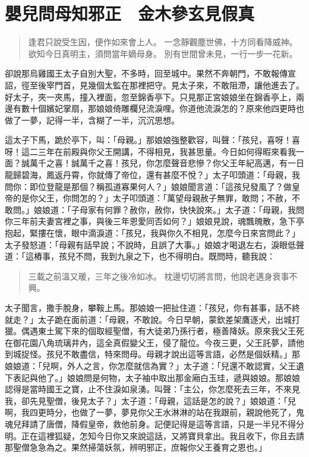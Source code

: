 
\chapter{嬰兒問母知邪正　金木參玄見假真}

\begin{quote}
逢君只說受生因，便作如來會上人。
一念靜觀塵世佛，十方同看降威神。
欲知今日真明主，須問當年嫡母身。
別有世間曾未見，一行一步一花新。
\end{quote}

卻說那烏雞國王太子自別大聖，不多時，回至城中。果然不奔朝門，不敢報傳宣詔，徑至後宰門首，見幾個太監在那裡把守。見太子來，不敢阻滯，讓他進去了。好太子，夾一夾馬，撞入裡面，忽至錦香亭下。只見那正宮娘娘坐在錦香亭上，兩邊有數十個嬪妃掌扇，那娘娘倚雕欄兒流淚哩。你道他流淚怎的？原來他四更時也做了一夢，記得一半，含糊了一半，沉沉思想。

這太子下馬，跪於亭下，叫：「母親。」那娘娘強整歡容，叫聲：「孩兒，喜呀！喜呀！這二三年在前殿與你父王開講，不得相見，我甚思量。今日如何得暇來看我一面？誠萬千之喜！誠萬千之喜！孩兒，你怎麼聲音悲慘？你父王年紀高邁，有一日龍歸碧海，鳳返丹霄，你就傳了帝位，還有甚麼不悅？」太子叩頭道：「母親，我問你：即位登龍是那個？稱孤道寡果何人？」娘娘聞言道：「這孩兒發風了？做皇帝的是你父王，你問怎的？」太子叩頭道：「萬望母親赦子無罪，敢問；不赦，不敢問。」娘娘道：「子母家有何罪？赦你，赦你，快快說來。」太子道：「母親，我問你三年前夫妻宮裡之事，與後三年恩愛同否如何？」娘娘見說，魂飄魄散，急下亭抱起，緊摟在懷，眼中滴淚道：「孩兒，我與你久不相見，怎麼今日來宮問此？」太子發怒道：「母親有話早說；不說時，且誤了大事。」娘娘才喝退左右，淚眼低聲道：「這樁事，孩兒不問，我到九泉之下，也不得明白。既問時，聽我說：
\begin{quote}
三載之前溫又暖，三年之後冷如冰。
枕邊切切將言問，他說老邁身衰事不興。
\end{quote}

太子聞言，撒手脫身，攀鞍上馬。那娘娘一把扯住道：「孩兒，你有甚事，話不終就走？」太子跪在面前道：「母親，不敢說。今日早朝，蒙欽差架鷹逐犬，出城打獵。偶遇東土駕下來的個取經聖僧，有大徒弟乃孫行者，極善降妖。原來我父王死在御花園八角琉璃井內，這全真假變父王，侵了龍位。今夜三更，父王託夢，請他到城捉怪。孩兒不敢盡信，特來問母。母親才說出這等言語，必然是個妖精。」那娘娘道：「兒啊，外人之言，你怎麼就信為實？」太子道：「兒還不敢認實，父王遺下表記與他了。」娘娘問是何物，太子袖中取出那金廂白玉珪，遞與娘娘。那娘娘認得是當時國王之寶，止不住淚如泉湧。叫聲：「主公，你怎麼死去三年，不來見我，卻先見聖僧，後見太子？」太子道：「母親，這話是怎的說？」娘娘道：「兒啊，我四更時分，也做了一夢，夢見你父王水淋淋的站在我跟前，親說他死了，鬼魂兒拜請了唐僧，降假皇帝，救他前身。記便記得是這等言語，只是一半兒不得分明。正在這裡狐疑，怎知今日你又來說這話，又將寶貝拿出。我且收下，你且去請那聖僧急急為之。果然掃蕩妖氛，辨明邪正，庶報你父王養育之恩也。」

